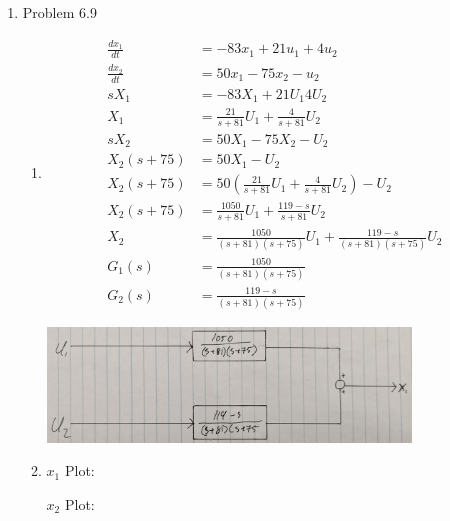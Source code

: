 \documentclass[12pt]{article}
\begin{document}
\begin{enumerate}
\begin{enumerate}
    \begin{center}
        
    \end{center}
\end{enumerate}


\newpage
\item Problem 6.9
    \begin{enumerate}
        \item 
        \begin{align*}
            \frac{dx_1}{dt} &= -83x_1 + 21u_1 + 4u_2 \\  
            \frac{dx_2}{dt} &= 50x_1 - 75x_2 - u_2 \\
            sX_1 &= -83X_1 + 21U_1 4U_2 \\
            X_1 &= \frac{21}{s+81} U_1 + \frac{4}{s+81} U_2 \\
            sX_2 &= 50X_1 - 75X_2 - U_2 \\
            X_2 (s+75) &= 50X_1 - U_2 \\
            X_2 (s+75) &= 50\left(\frac{21}{s+81} U_1 + \frac{4}{s+81} U_2\right) - U_2 \\
            X_2 (s+75) &= \frac{1050}{s+81} U_1 + \frac{119-s}{s+81} U_2 \\
            X_2 &= \frac{1050}{\left(s+81\right)\left(s+75\right)} U_1 + \frac{119-s}{\left(s+81\right)\left(s+75\right)} U_2 \\
            G_1(s) &= \frac{1050}{\left(s+81\right)\left(s+75\right)} \\
            G_2(s) &= \frac{119-s}{\left(s+81\right)\left(s+75\right)}
        \end{align*}

        \begin{center}
            \includegraphics[width=0.8\textwidth]{assets/block_diagram.jpg}
        \end{center}
        \item 
        
        $x_1$ Plot:

        

        $x_2$ Plot:
        
        
    \end{enumerate}


\end{enumerate}
\end{document}
